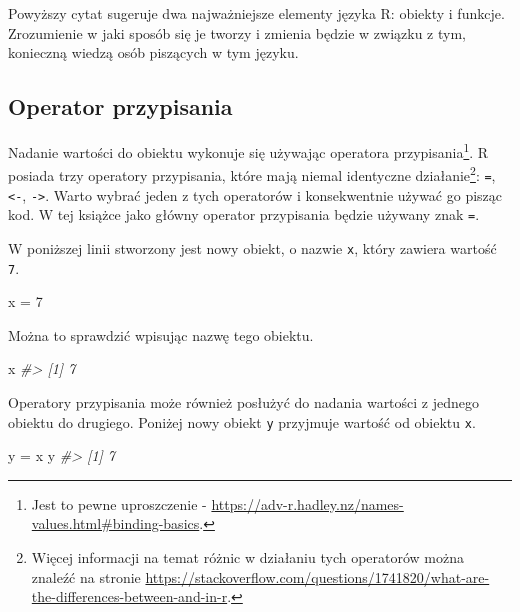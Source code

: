 \documentclass[paper=6in:9in,pagesize=pdftex,headinclude=on,footinclude=on,10pt]{scrbook}
\newenvironment{Shaded}{\begin{snugshade}}{\end{snugshade}}
\newcommand{\CommentTok}[1]{\textcolor[rgb]{0.56,0.35,0.01}{\textit{#1}}}
\newcommand{\DecValTok}[1]{\textcolor[rgb]{0.00,0.00,0.81}{#1}}
\newcommand{\NormalTok}[1]{#1}
\newcommand{\StringTok}[1]{\textcolor[rgb]{0.31,0.60,0.02}{#1}}
\begin{document}
Powyższy cytat sugeruje dwa najważniejsze elementy języka R: obiekty i funkcje.
Zrozumienie w jaki sposób się je tworzy i zmienia będzie w związku z tym, konieczną wiedzą osób piszących w tym języku.

\hypertarget{operator-przypisania}{%
\subsection{Operator przypisania}\label{operator-przypisania}}

Nadanie wartości do obiektu wykonuje się używając operatora przypisania\footnote{Jest to pewne uproszczenie - \url{https://adv-r.hadley.nz/names-values.html\#binding-basics}.}.
R posiada trzy operatory przypisania, które mają niemal identyczne działanie\footnote{Więcej informacji na temat różnic w działaniu tych operatorów można znaleźć na stronie \url{https://stackoverflow.com/questions/1741820/what-are-the-differences-between-and-in-r}.}: \texttt{=}, \texttt{\textless{}-}, \texttt{-\textgreater{}}.
Warto wybrać jeden z tych operatorów i konsekwentnie używać go pisząc kod.
W tej książce jako główny operator przypisania będzie używany znak \texttt{=}.

W poniższej linii stworzony jest nowy obiekt, o nazwie \texttt{x}, który zawiera wartość \texttt{7}.

\begin{Shaded}
\begin{Highlighting}[]
\NormalTok{x =}\StringTok{ }\DecValTok{7}
\end{Highlighting}
\end{Shaded}

Można to sprawdzić wpisując nazwę tego obiektu.

\begin{Shaded}
\begin{Highlighting}[]
\NormalTok{x}
\CommentTok{#> [1] 7}
\end{Highlighting}
\end{Shaded}

Operatory przypisania może również posłużyć do nadania wartości z jednego obiektu do drugiego.
Poniżej nowy obiekt \texttt{y} przyjmuje wartość od obiektu \texttt{x}.

\begin{Shaded}
\begin{Highlighting}[]
\NormalTok{y =}\StringTok{ }\NormalTok{x}
\NormalTok{y}
\CommentTok{#> [1] 7}
\end{Highlighting}
\end{Shaded}
\end{document}
